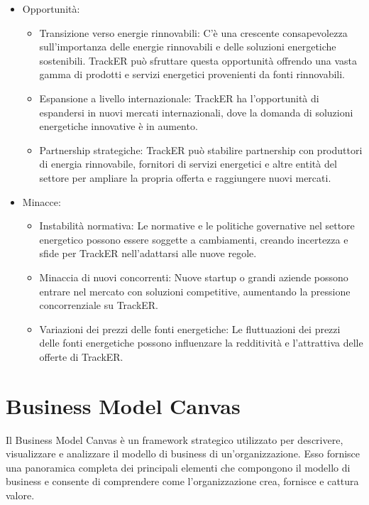 \documentclass[oneside]{book}
\begin{document}
\begin{itemize}
    \item Opportunità:
        \begin{itemize}
            \item Transizione verso energie rinnovabili: C'è una crescente consapevolezza sull'importanza delle energie rinnovabili e delle soluzioni energetiche sostenibili. TrackER può sfruttare questa opportunità offrendo una vasta gamma di prodotti e servizi energetici provenienti da fonti rinnovabili.
            \item Espansione a livello internazionale: TrackER ha l'opportunità di espandersi in nuovi mercati internazionali, dove la domanda di soluzioni energetiche innovative è in aumento.
            \item Partnership strategiche: TrackER può stabilire partnership con produttori di energia rinnovabile, fornitori di servizi energetici e altre entità del settore per ampliare la propria offerta e raggiungere nuovi mercati.
        \end{itemize}
\end{itemize}


\begin{itemize}
    \item Minacce:
        \begin{itemize}
            \item Instabilità normativa: Le normative e le politiche governative nel settore energetico possono essere soggette a cambiamenti, creando incertezza e sfide per TrackER nell'adattarsi alle nuove regole.
            \item Minaccia di nuovi concorrenti: Nuove startup o grandi aziende possono entrare nel mercato con soluzioni competitive, aumentando la pressione concorrenziale su TrackER.
            \item Variazioni dei prezzi delle fonti energetiche: Le fluttuazioni dei prezzi delle fonti energetiche possono influenzare la redditività e l'attrattiva delle offerte di TrackER.
        \end{itemize}
\end{itemize}

\section{Business Model Canvas}
Il Business Model Canvas è un framework strategico utilizzato per descrivere, visualizzare e analizzare il modello di business di un'organizzazione. Esso fornisce una panoramica completa dei principali elementi che compongono il modello di business e consente di comprendere come l'organizzazione crea, fornisce e cattura valore.
\end{document}
